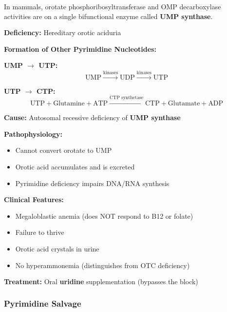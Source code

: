 \begin{tcolorbox}[colback=green!5, colframe=green!70!black, title=\textbf{UMP Synthase: Bifunctional Enzyme}]
In mammals, orotate phosphoribosyltransferase and OMP decarboxylase activities are on a single bifunctional enzyme called \textbf{UMP synthase}.

\textbf{Deficiency:} Hereditary orotic aciduria
\end{tcolorbox}

\textbf{Formation of Other Pyrimidine Nucleotides:}

\textbf{UMP $\rightarrow$ UTP:}
\[
\text{UMP} \xrightarrow{\text{kinases}} \text{UDP} \xrightarrow{\text{kinases}} \text{UTP}
\]

\textbf{UTP $\rightarrow$ CTP:}
\[
\text{UTP} + \text{Glutamine} + \text{ATP} \xrightarrow{\text{CTP synthetase}} \text{CTP} + \text{Glutamate} + \text{ADP}
\]

\begin{tcolorbox}[colback=red!5, colframe=red!70!black, title=\textbf{Clinical Correlation: Hereditary Orotic Aciduria}]
\textbf{Cause:} Autosomal recessive deficiency of \textbf{UMP synthase}

\textbf{Pathophysiology:}
\begin{itemize}
    \item Cannot convert orotate to UMP
    \item Orotic acid accumulates and is excreted
    \item Pyrimidine deficiency impairs DNA/RNA synthesis
\end{itemize}

\textbf{Clinical Features:}
\begin{itemize}
    \item Megaloblastic anemia (does NOT respond to B12 or folate)
    \item Failure to thrive
    \item Orotic acid crystals in urine
    \item No hyperammonemia (distinguishes from OTC deficiency)
\end{itemize}

\textbf{Treatment:} Oral \textbf{uridine} supplementation (bypasses the block)
\end{tcolorbox}

\subsubsection{Pyrimidine Salvage}

